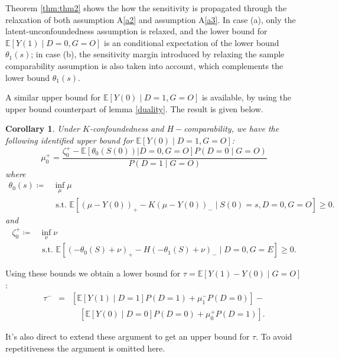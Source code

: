 \documentclass[12pt]{article}
\newtheorem{cor}{Corollary}
\newcommand{\Ep}{\mathbb{E}}
\begin{document}
	Theorem \ref{thm:thm2} shows the how the sensitivity is propagated through the relaxation of both assumption A\ref{a2} and assumption A\ref{a3}. In case (a), only the latent-unconfoundedness assumption is relaxed, and the lower bound for $\Ep[Y(1) \mid D = 0, G =O]$ is an conditional expectation of the lower bound $\theta_1(s)$; in case (b), the sensitivity margin introduced by relaxing the sample comparability assumption is also taken into account, which complements the lower bound $\theta_1(s)$. 
	
	A similar upper bound for $\Ep[Y(0) \mid D = 1, G= O]$ is available, by using the upper bound counterpart of lemma \ref{duality}. The result is given below.
	\begin{cor}
			Under $K$-confoundedness and $H-$comparability, we have the following identified upper bound for $\Ep[Y(0) \mid D = 1, G= O]$:
			$$
			\mu^+_0 =\frac{\zeta_0^+ - \Ep[\theta_0(S(0)) | D = 0, G = O] P(D = 0 \mid G = O)}{P(D = 1 \mid G = O)}
			$$
			where 
			\begin{equation}\label{eq:eq5}
			\begin{array}{ll}
			\theta_0(s) \coloneqq & \inf _{\mu}  \mu \\
			& \text { s.t. }  \mathbb{E}\left[(\mu - Y(0))_+ - K (\mu - Y(0))_- \mid S(0) = s, D = 0, G = O \right] \geq 0.
			\end{array}
			\end{equation}
			and
			\begin{equation}\label{eq:eq6}
			\begin{array}{ll}
			\zeta_0^+ \coloneqq & \inf _{\nu}  \nu \\
			& \text { s.t. }  \mathbb{E}\left[(-\theta_0(S)+\nu)_{+}-H(-\theta_1(S)+\nu)_{-} \mid D=0, G = E\right] \geq 0.
			\end{array}
			\end{equation}
	\end{cor}
	
	Using these bounds we obtain a lower bound for $\tau = \Ep[Y(1) - Y(0) \mid G = O]$:
	\begin{eqnarray*}
		\tau^-  & = & \left[\Ep[Y(1) \mid D = 1]P(D = 1) + \mu_1^-  P(D = 0)\right] - \\
		 & & \quad \left[\Ep[Y(0) \mid D = 0]P(D = 0) + \mu_0^+ P(D = 1)\right].
	\end{eqnarray*}
	
	It's also direct to extend these argument to get an upper bound for $\tau$. To avoid repetitiveness the argument is omitted here.
	
\end{document}
